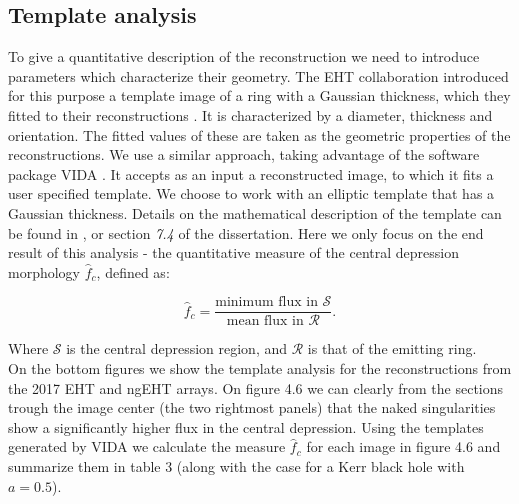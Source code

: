 \documentclass[12pt]{article}
\numberwithin{equation}{section}
\numberwithin{figure}{section}
\begin{document}
	
	\subsection{Template analysis}
	
	To give a quantitative description of the reconstruction we need to introduce parameters which characterize their geometry. The EHT collaboration introduced for this purpose a template image of a ring with a Gaussian thickness, which they fitted to their reconstructions \cite{EHT_M87_VI}. It is characterized by a diameter, thickness and orientation. The fitted values of these are taken as the geometric properties of the reconstructions. We use a similar approach, taking advantage of the software package VIDA \cite{VIDA}. It accepts as an input a reconstructed image, to which it fits a user specified template. We choose to work with an elliptic template that has a Gaussian thickness. Details on the mathematical description of the template can be found in \cite{VIDA}, or section \emph{7.4} of the dissertation. Here we only focus on the end result of this analysis - the quantitative measure of the central depression morphology $\hat{f}_c$, defined as:
	
	\begin{equation}
		\hat{f}_c = \frac{\text{minimum flux in }\mathcal{S}}{\text{mean flux in }\mathcal{R}}.
	\end{equation}
	
	\noindent Where $\mathcal{S}$ is the central depression region, and $\mathcal{R}$ is that of the emitting ring.\\
	
	\noindent On the bottom figures we show the template analysis for the reconstructions from the 2017 EHT and ngEHT arrays. On figure 4.6 we can clearly from the sections trough the image center (the two rightmost panels) that the naked singularities show a significantly higher flux in the central depression. Using the templates generated by VIDA we calculate the measure $\hat{f}_c$ for each image in figure 4.6 and summarize them in table 3 (along with the case for a Kerr black hole with $a = 0.5$).
	
\end{document}
